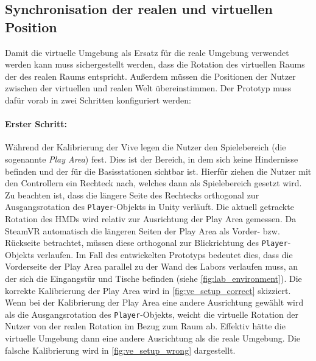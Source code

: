 \subsection*{Synchronisation der realen und virtuellen Position}
Damit die virtuelle Umgebung als Ersatz für die reale Umgebung verwendet werden kann muss sichergestellt werden, dass die Rotation des virtuellen Raums der des realen Raums entspricht.
Außerdem müssen die Positionen der Nutzer zwischen der virtuellen und realen Welt übereinstimmen.
Der Prototyp muss dafür vorab in zwei Schritten konfiguriert werden:

\paragraph{Erster Schritt:}
Während der Kalibrierung der Vive legen die Nutzer den Spielebereich (die sogenannte \emph{Play Area}) fest.
Dies ist der Bereich, in dem sich keine Hindernisse befinden und der für die Basisstationen sichtbar ist.
Hierfür ziehen die Nutzer mit den Controllern ein Rechteck nach, welches dann als Spielebereich gesetzt wird.
Zu beachten ist, dass die längere Seite des Rechtecks orthogonal zur Ausgangsrotation des \lstinline{Player}-Objekts in Unity verläuft.
Die aktuell getrackte Rotation des HMDs wird relativ zur Ausrichtung der Play Area gemessen.
Da SteamVR automatisch die längeren Seiten der Play Area als Vorder- bzw. Rückseite betrachtet, müssen diese orthogonal zur Blickrichtung des \lstinline{Player}-Objekts verlaufen.
Im Fall des entwickelten Prototyps bedeutet dies, dass die Vorderseite der Play Area parallel zu der Wand des Labors verlaufen muss, an der sich die Eingangstür und Tische befinden (siehe \autoref{fig:lab_environment}).
Die korrekte Kalibrierung der Play Area wird in \autoref{fig:ve_setup_correct} skizziert.
Wenn bei der Kalibrierung der Play Area eine andere Ausrichtung gewählt wird als die Ausgangsrotation des \lstinline{Player}-Objekts, weicht die virtuelle Rotation der Nutzer von der realen Rotation im Bezug zum Raum ab.
Effektiv hätte die virtuelle Umgebung dann eine andere Ausrichtung als die reale Umgebung.
Die falsche Kalibrierung wird in \autoref{fig:ve_setup_wrong} dargestellt.

